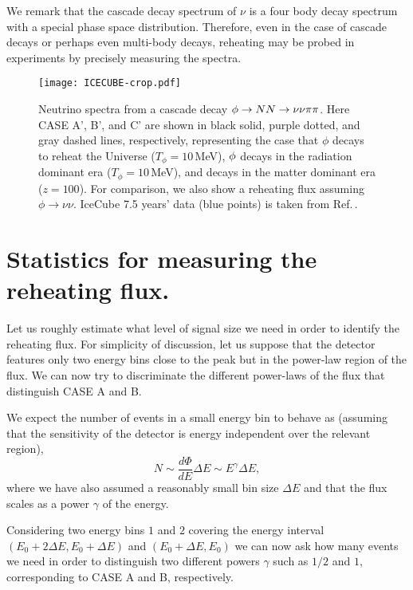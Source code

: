 \documentclass[superscriptaddress,aps,preprintnumbers,amsmath,showpacs,amssymb,prd,nofootinbib,reprint]{revtex4-1}
\begin{document}
{{We remark that the cascade decay spectrum of $\nu$ is a four body decay spectrum with a special phase space distribution. 
Therefore, even in the case of 
cascade decays or perhaps even multi-body decays, reheating may be probed in 
experiments by precisely measuring the spectra. 






\begin{figure}[t!]
\begin{center}  
\texttt{[image: ICECUBE-crop.pdf]}
\end{center}
\caption{Neutrino spectra from a cascade decay $\phi \to N N\to \nu {\nu} \pi\pi$. {Here CASE} A', B', and C' are shown in black solid, purple dotted, and gray dashed lines, respectively, representing the case that $\phi$ decays to reheat the Universe ($T_\phi=10\,$MeV), $\phi$ decays in the radiation dominant era ($T_\phi=10\,$MeV), and decays in the matter dominant era ($z=100$). For comparison, we also {show a reheating} flux assuming $\phi \to \nu {\nu}$. 
IceCube 7.5 years' data (blue points) is taken from Ref.\,\cite{Abbasi:2020jmh}.
}
\label{fig:ICECUBE}
\end{figure}

\section{Statistics for measuring the reheating flux.}
\label{Appendix:C}
Let us roughly estimate what level of signal size we need in order to identify the reheating flux.
For simplicity of discussion, let us suppose that the  detector features only two energy bins close to the peak but in the power-law region of the flux.   
We can now try to discriminate the different power-laws of the flux that distinguish CASE A and B. 

We expect the number of events in a small energy bin to behave as (assuming that the sensitivity of the detector is energy independent over the relevant region),
\begin{equation}
    N\sim \frac{d\Phi}{dE} \Delta E\sim E^\gamma \Delta E,
\end{equation}
where we have also assumed a reasonably small bin size $\Delta E$ and that the flux scales as a power $\gamma$ of the energy.

Considering two energy bins $1$ and $2$ covering the energy interval $(E_0+2\Delta E,E_0+\Delta E)$ and $(E_0+\Delta E,E_0)$ we can now ask how many events we need in order to distinguish two different powers $\gamma$ such as $1/2$ and $1$, corresponding to CASE A and B, respectively.

}}
\end{document}
